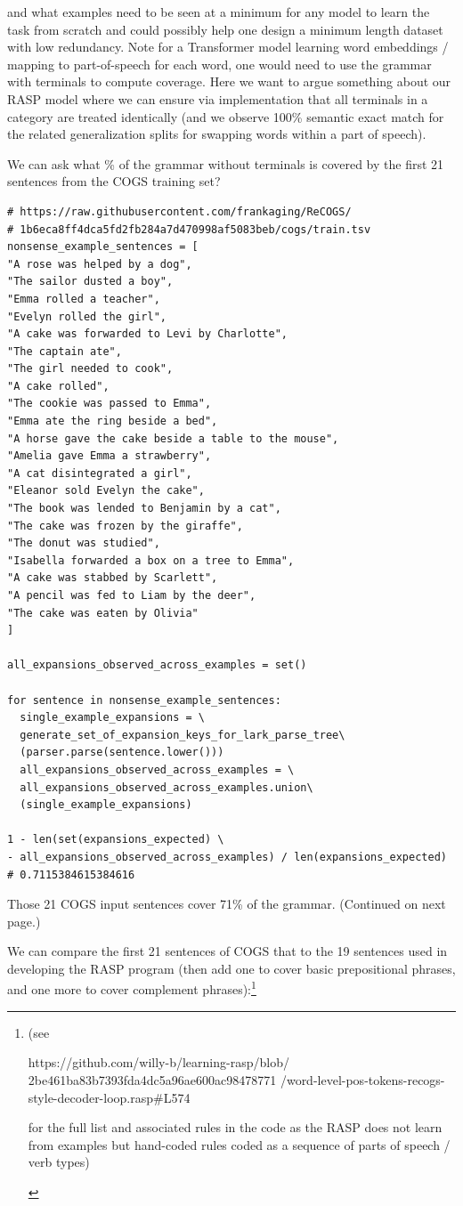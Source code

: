 \documentclass[11pt]{article}
\begin{document}
and what examples need to be seen at a minimum for any model to learn the task from scratch and could possibly help one design a minimum length dataset with low redundancy.
Note for a Transformer model learning word embeddings / mapping to part-of-speech for each word, one would need to use the grammar with terminals to compute coverage. Here we want to argue something about our RASP model where we can ensure via implementation that all terminals in a category are treated identically (and we observe 100\% semantic exact match for the related generalization splits for swapping words within a part of speech).


We can ask what \% of the grammar without terminals is covered by the first 21 sentences from the COGS training set?
\begin{tiny}
\begin{verbatim}
# https://raw.githubusercontent.com/frankaging/ReCOGS/
# 1b6eca8ff4dca5fd2fb284a7d470998af5083beb/cogs/train.tsv
nonsense_example_sentences = [
"A rose was helped by a dog",
"The sailor dusted a boy",
"Emma rolled a teacher",
"Evelyn rolled the girl",
"A cake was forwarded to Levi by Charlotte",
"The captain ate",
"The girl needed to cook",
"A cake rolled",
"The cookie was passed to Emma",
"Emma ate the ring beside a bed",
"A horse gave the cake beside a table to the mouse",
"Amelia gave Emma a strawberry",
"A cat disintegrated a girl",
"Eleanor sold Evelyn the cake",
"The book was lended to Benjamin by a cat",
"The cake was frozen by the giraffe",
"The donut was studied",
"Isabella forwarded a box on a tree to Emma",
"A cake was stabbed by Scarlett",
"A pencil was fed to Liam by the deer",
"The cake was eaten by Olivia"
]

all_expansions_observed_across_examples = set()

for sentence in nonsense_example_sentences:
  single_example_expansions = \
  generate_set_of_expansion_keys_for_lark_parse_tree\
  (parser.parse(sentence.lower()))
  all_expansions_observed_across_examples = \
  all_expansions_observed_across_examples.union\
  (single_example_expansions)

1 - len(set(expansions_expected) \
- all_expansions_observed_across_examples) / len(expansions_expected)
# 0.7115384615384616
\end{verbatim}
\end{tiny}
Those 21 COGS input sentences cover 71\% of the grammar. (Continued on next page.)

We can compare the first 21 sentences of COGS that to the 19 sentences used in developing the RASP program (then add one to cover basic prepositional phrases, and one more to cover complement phrases):\footnote{\begin{footnotesize}(see 

https://github.com/willy-b/learning-rasp/blob/
2be461ba83b7393fda4dc5a96ae600ac98478771
/word-level-pos-tokens-recogs-style-decoder-loop.rasp\#L574

for the full list and associated rules in the code as the RASP does not learn from examples but hand-coded rules coded as a sequence of parts of speech / verb types)\end{footnotesize}}
\end{document}
